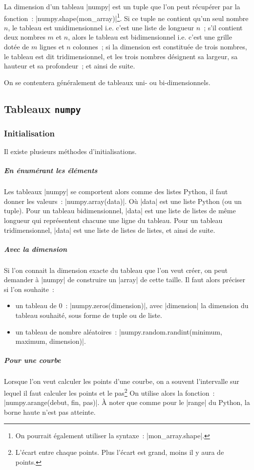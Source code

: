 		La dimension d'un tableau \python|numpy| est un tuple que l'on peut récupérer par la fonction~: \python|numpy.shape(mon_array)|\footnote{On pourrait également utiliser la syntaxe~: \python|mon_array.shape|.}. Si ce tuple ne contient qu'un seul nombre $n$, le tableau est unidimensionnel i.e. c'est une liste de longueur $n$~; s'il contient deux nombres $m$ et $n$, alors le tableau est bidimensionnel i.e. c'est une grille dotée de $m$ lignes et $n$ colonnes~; si la dimension est constituée de trois nombres, le tableau est dit tridimensionnel, et les trois nombres désignent sa largeur, sa hauteur et sa profondeur~; et ainsi de suite.
		
		On se contentera généralement de tableaux uni- ou bi-dimensionnels.
	
	\subsection{Tableaux \texttt{numpy}}
	
		\subsubsection{Initialisation}
		
		Il existe plusieurs méthodes d'initialisations.
		
		\subparagraph{En énumérant les éléments}
		Les tableaux \python|numpy| se comportent alors comme des listes Python, il faut donner les valeurs~: \python|numpy.array(data)|.
		Où \python|data| est une liste Python (ou un tuple). Pour un tableau bidimensionnel, \python|data| est une liste de listes de même longueur qui représentent chacune une ligne du tableau. Pour un tableau tridimensionnel, \python|data| est une liste de listes de listes, et ainsi de suite.
		
		\subparagraph{Avec la dimension}
		Si l'on connait la dimension exacte du tableau que l'on veut créer, on peut demander à \python|numpy| de construire un \python|array| de cette taille.
		Il faut alors préciser si l'on souhaite~:
		\begin{itemize}
			\item un tableau de 0~: \python|numpy.zeros(dimension)|, avec \python|dimension| la dimension du tableau souhaité, sous forme de tuple ou de liste.
			\item un tableau de nombre aléatoires~: \python|numpy.random.randint(minimum, maximum, dimension)|.
		\end{itemize}
		
		\subparagraph{Pour une courbe}
		Lorsque l'on veut calculer les points d'une courbe, on a souvent l'intervalle sur lequel il faut calculer les points et le pas\footnote{L'écart entre chaque points. Plus l'écart est grand, moins il y aura de points.}
		On utilise alors la fonction~:\\\python|numpy.arange(debut, fin, pas)|. À noter que comme pour le \python|range| du Python, la borne haute n'est pas atteinte.
		
